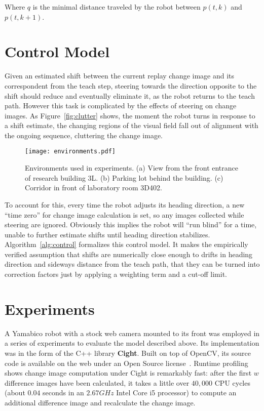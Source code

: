 \documentclass[twocolumn, 9pt,fleqn]{jsproceedings}
\begin{document}
Where $q$ is the minimal distance traveled by the robot between $p(t, k)$ and $p(t, k+1)$.

\section{Control Model}

Given an estimated shift between the current replay change image and its correspondent from the teach step, steering towards the direction opposite to the shift should reduce and eventually eliminate it, as the robot returns to the teach path. However this task is complicated by the effects of steering on change images. As Figure~\ref{fig:clutter} shows, the moment the robot turns in response to a shift estimate, the changing regions of the visual field fall out of alignment with the ongoing sequence, cluttering the change image.

\begin{figure}[h!]
\texttt{[image: environments.pdf]}
\caption{Environments used in experiments. (a) View from the front entrance of research building 3L. (b) Parking lot behind the building. (c) Corridor in front of laboratory room 3D402.}
\label{fig:environments}
\end{figure}

To account for this, every time the robot adjusts its heading direction, a new ``time zero'' for change image calculation is set, so any images collected while steering are ignored. Obviously this implies the robot will ``run blind'' for a time, unable to further estimate shifts until heading direction stabilizes. Algorithm~\ref{alg:control} formalizes this control model. It makes the empirically verified assumption that shifts are numerically close enough to drifts in heading direction and sideways distance from the teach path, that they can be turned into correction factors just by applying a weighting term and a cut-off limit.

\section{Experiments}

A Yamabico robot with a stock web camera mounted to its front was employed in a series of experiments to evaluate the model described above. Its implementation was in the form of the C++ library \textbf{Cight}. Built on top of OpenCV, its source code is available on the web under an Open Source license~\cite{HEL14c}. Runtime profiling shows change image computation under Cight is remarkably fast: after the first $w$ difference images have been calculated, it takes a little over $40,000$ CPU cycles (about $0.04$ seconds in an $2.67GHz$ Intel Core i5 processor) to compute an additional difference image and recalculate the change image.
\end{document}
